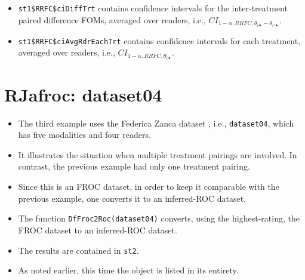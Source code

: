 \documentclass[
]{book}
\newenvironment{Shaded}{\begin{snugshade}}{\end{snugshade}}
\newcommand{\CommentTok}[1]{\textcolor[rgb]{0.56,0.35,0.01}{\textit{#1}}}
\newcommand{\DataTypeTok}[1]{\textcolor[rgb]{0.13,0.29,0.53}{#1}}
\newcommand{\DecValTok}[1]{\textcolor[rgb]{0.00,0.00,0.81}{#1}}
\newcommand{\KeywordTok}[1]{\textcolor[rgb]{0.13,0.29,0.53}{\textbf{#1}}}
\newcommand{\NormalTok}[1]{#1}
\newcommand{\OperatorTok}[1]{\textcolor[rgb]{0.81,0.36,0.00}{\textbf{#1}}}
\providecommand{\tightlist}{%
  \setlength{\itemsep}{0pt}\setlength{\parskip}{0pt}}
\begin{document}
\begin{itemize}
\tightlist
\item
  \texttt{st1\$RRFC\$ciDiffTrt} contains confidence intervals for the inter-treatment paired difference FOMs, averaged over readers, i.e., \(CI_{1-\alpha,RRFC,\theta_{i \bullet} - \theta_{i' \bullet}}\).
\end{itemize}

\begin{Shaded}
\end{Shaded}

\begin{itemize}
\tightlist
\item
  \texttt{st1\$RRFC\$ciAvgRdrEachTrt} contains confidence intervals for each treatment, averaged over readers, i.e., \(CI_{1-\alpha,RRFC,\theta_{i \bullet}}\).
\end{itemize}

\hypertarget{ORApplications-dataset04-RJafroc}{%
\section{RJafroc: dataset04}\label{ORApplications-dataset04-RJafroc}}

\begin{itemize}
\tightlist
\item
  The third example uses the Federica Zanca dataset \citep{RN1882}, i.e., \texttt{dataset04}, which has five modalities and four readers.
\item
  It illustrates the situation when multiple treatment pairings are involved. In contrast, the previous example had only one treatment pairing.
\item
  Since this is an FROC dataset, in order to keep it comparable with the previous example, one converts it to an inferred-ROC dataset.
\item
  The function \texttt{DfFroc2Roc(dataset04)} converts, using the highest-rating, the FROC dataset to an inferred-ROC dataset.
\item
  The results are contained in \texttt{st2}.
\item
  As noted earlier, this time the object is listed in its entirety.
\end{itemize}
\end{document}
